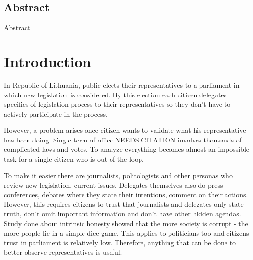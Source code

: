 \documentclass[a4paper,12pt]{article}
\begin{document}
    
    
    
    \begin{center}
        \section*{Abstract}
    \end{center}
        
        Abstract
    \clearpage
    
    \tableofcontents
    
    \clearpage
    
    \printglossary[type=\acronymtype]
    
    \clearpage
    
    \printglossary
    
    \clearpage
    
    
    \section{Introduction}
    
    In Republic of Lithuania, public elects their representatives to a parliament in which new legislation is considered. By this election each citizen delegates specifics of legislation process to their representatives so they don't have to actively participate in the process.
	
	However, a problem arises once citizen wants to validate what his representative has been doing. Single term of office NEEDS-CITATION involves thousands of complicated laws and votes. To analyze everything becomes almost an impossible task for a single citizen who is out of the loop. 
	
	To make it easier there are journalists, politologists and other personas who review new legislation, current issues. Delegates themselves also do press conferences, debates where they state their intentions, comment on their actions. However, this requires citizens to trust that journalists and delegates only state truth, don't omit important information and don't have other hidden agendas. Study done about intrinsic honesty showed that the more society is corrupt - the more people lie in a simple dice game. This applies to politicians too and citizens trust in parliament is relatively low.  Therefore, anything that can be done to better observe representatives is useful.
\end{document}
